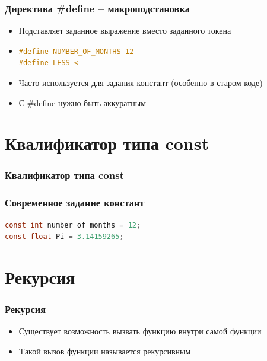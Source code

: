 \documentclass[12pt,pdf,hyperref={unicode}]{beamer}
\begin{document}
\begin{frame}[fragile]
\frametitle{Директива \#define -- макроподстановка} 
\begin{itemize}
\item Подставляет заданное выражение вместо заданного токена
\item \begin{lstlisting}[language=C,basicstyle=\ttfamily,keywordstyle=\color{blue}]
#define NUMBER_OF_MONTHS 12
#define LESS <
\end{lstlisting}
\item Часто используется для задания констант (особенно в старом коде)
\item С \#define нужно быть аккуратным
\end{itemize}
\end{frame}


\section{Квалификатор типа const}

\begin{frame}[fragile]
\frametitle{Квалификатор типа const} 
\frametitle{Современное задание констант}
\begin{lstlisting}[language=C,basicstyle=\ttfamily,keywordstyle=\color{blue}]
const int number_of_months = 12;
const float Pi = 3.14159265;
\end{lstlisting}
\end{frame}

\fi

\section{Рекурсия}


\begin{frame}[fragile]
\frametitle{Рекурсия} 
\begin{itemize}
\item Существует возможность вызвать функцию внутри самой функции
\item Tакой вызов функции называется рекурсивным
\end{itemize}
\end{frame}
\end{document}
